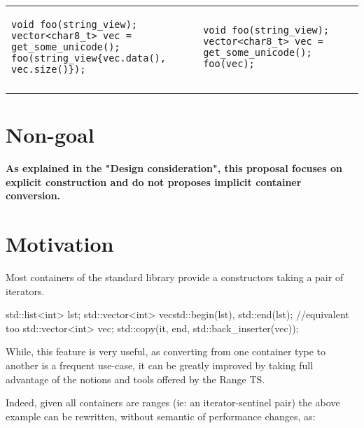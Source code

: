 \documentclass{wg21}
\begin{document}
\begin{center}
\begin{tabular}{l|l}
\begin{minipage}[t]{0.5\textwidth}
\begin{verbatim}
void foo(string_view);
vector<char8_t> vec = get_some_unicode();
foo(string_view{vec.data(), vec.size()});

\end{verbatim}
\end{minipage}
&	
\begin{minipage}[t]{0.5\textwidth}
\begin{verbatim}	
void foo(string_view);
vector<char8_t> vec = get_some_unicode();
foo(vec);
\end{verbatim}
\end{minipage}
\\\\ \hline



\end{tabular}
\end{center}

\section{Non-goal}

{\bf As explained in the "Design consideration", this proposal focuses on explicit construction and do not proposes implicit container conversion.}

\section{Motivation}

Most containers of the standard library provide a constructors taking a pair of iterators.

\begin{codeblock}
    std::list<int> lst;
    std::vector<int> vec{std::begin(lst), std::end(lst)};
    //equivalent too
    std::vector<int> vec;
    std::copy(it, end, std::back_inserter(vec));
\end{codeblock}

While, this feature is very useful, as converting from one container type to another is a frequent
use-case, it can be greatly improved by taking full advantage of the notions and tools offered by the Range TS.

Indeed, given all containers are ranges (ie: an iterator-sentinel pair) the above example can be rewritten, without semantic of performance changes, as:
\end{document}
